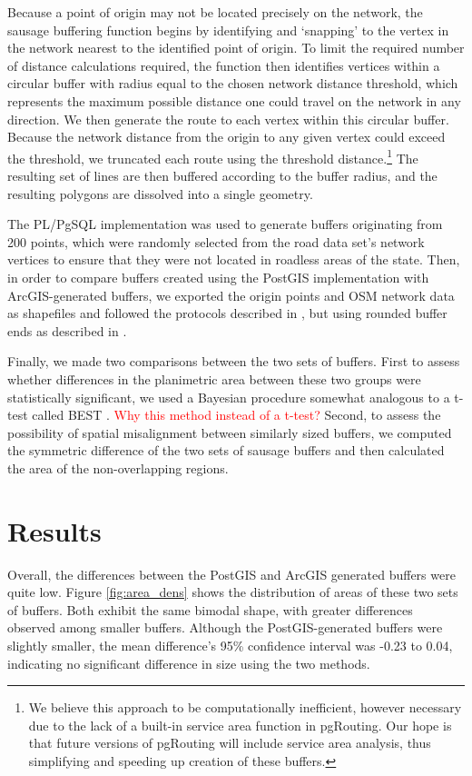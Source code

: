 \documentclass[11pt,letterpaper]{article} %
\begin{document}
Because a point of origin may not be located precisely on the network,
the sausage buffering function begins by identifying and `snapping' to the
vertex in the network nearest to the identified point of origin. To limit the
required number of distance calculations required, the function then
identifies vertices within a circular buffer with radius equal to the
chosen network distance threshold, which represents the maximum
possible distance one could travel on the network in any
direction. We then generate the route to each vertex within this
circular buffer. Because the network distance from the origin to any given vertex could exceed the threshold, we truncated each route using the threshold distance.\footnote{We
  believe this approach to be computationally inefficient, however
  necessary due to the lack of a built-in service area function in
  pgRouting. Our hope is that future versions of pgRouting will
  include service area analysis, thus simplifying and speeding up
  creation of these buffers.} The resulting set of lines are then
buffered according to the buffer radius, and the resulting polygons
are dissolved into a single geometry.

The PL/PgSQL implementation was used to generate buffers originating from 200 points, which were randomly selected from the road data set's network vertices to ensure that they were not located in
roadless areas of the state. Then, in order to compare buffers
created using the PostGIS implementation with ArcGIS-generated buffers, we exported the origin points and OSM network data as shapefiles and followed the protocols described in
\textcite{Forsyth2012proto}, but using rounded buffer ends as described in \textcite{Forsyth2014sausage}. 

Finally, we made two comparisons between the two sets of
buffers. First to assess whether differences in
the planimetric area between these two groups were statistically significant, we
used a Bayesian procedure somewhat analogous to a t-test called BEST
\autocite{Kruschke2014,Kruschke2013}. \textcolor{red}{Why this method instead of a t-test?} Second, to assess the possibility of
spatial misalignment between similarly sized buffers, we computed the
symmetric difference of the two sets of sausage buffers and then
calculated the area of the non-overlapping regions.


\section*{Results}
Overall, the differences between the PostGIS and ArcGIS generated buffers were quite low. Figure
\ref{fig:area_dens} shows the distribution of areas of these two sets of
buffers. Both exhibit the same bimodal shape, with greater
differences observed among smaller buffers. Although the PostGIS-generated buffers were slightly smaller, the mean difference's 95\% confidence interval was -0.23 to 0.04, indicating no significant difference in size using the two methods.
\end{document}
